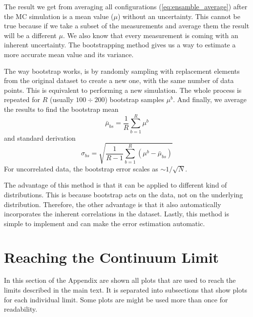 The result we get from averaging all configurations (\ref{eq:ensamble_average}) after the MC simulation is a mean value ($\mu$) without an uncertainty. This cannot be true because if we take a subset of the measurements and average them the result will be a different $\mu$. We also know that every measurement is coming with an inherent uncertainty. The bootstrapping method gives us a way to estimate a more accurate mean value and its variance.

The way bootstrap works, is by randomly sampling with replacement elements from the original dataset to create a new one, with the same number of data points. This is equivalent to performing a new simulation. The whole process is repeated for $R$ (usually $100\div200$) bootstrap samples $\mu^b$. And finally, we average the results to find the bootstrap mean
\begin{equation}
  \bar{\mu}_{bs} = \frac{1}{R}\sum^R_{b=1} \mu^b
\end{equation}
and standard derivation
\begin{equation}
  \sigma_{bs} = \sqrt{\frac{1}{R-1}\sum^R_{b=1} (\mu^b-\bar{\mu}_{bs})}
\end{equation}
For uncorrelated data, the bootstrap error scales as ${\sim}1/\sqrt{N}$.

The advantage of this method is that it can be applied to different kind of distributions. This is because bootstrap acts on the data, not on the underlying distribution. Therefore, the other advantage is that it also automatically incorporates the inherent correlations in the dataset. Lastly, this method is simple to implement and can make the error estimation automatic.

\section{Reaching the Continuum Limit}
\label{app:limit}

In this section of the Appendix are shown all plots that are used to reach the limits described in the main text. It is separated into subsections that show plots for each individual limit. Some plots are might be used more than once for readability.

